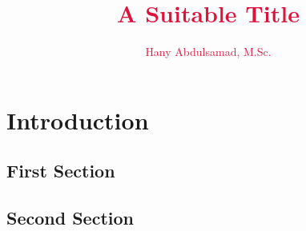 \documentclass{iasthesis}
\begin{document}
	
	\title{\textcolor{crimson} {A Suitable Title}}
	\author{\textcolor{crimson} {Hany Abdulsamad, M.Sc.}}
	
	\maketitle
	
	\begin{dedication}
		
	\end{dedication}

	
	
	\begin{acknowledgements}
		
	\end{acknowledgements}

	\begin{kurzfassung}
		\begin{otherlanguage}{ngerman}
			
		\end{otherlanguage}
	\end{kurzfassung}

	\begin{abstract}
		
	\end{abstract}
	
	\dominitoc[n]
		
	{
		\renewcommand{\raggedchapter}{\raggedleft}
		\renewcommand*{\chapterformat}{\thechapter}
		
		\tableofcontents
		\clearpage
	}
	
	
		
	\chapter{Introduction}
	\minitoc 
	\kant
	\section{First Section}
	\kant
	\section{Second Section}
	\kant
\end{document}

